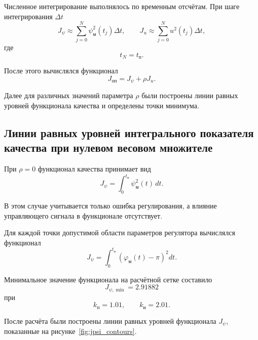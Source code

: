 Численное интегрирование выполнялось по временным отсчётам. При шаге интегрирования \(\Delta t\)
\begin{equation}
J_{\psi}
\approx
\sum_{j=0}^{N}
\psi_{\text{м}}^2(t_j)\Delta t,
\qquad
J_u
\approx
\sum_{j=0}^{N}
u^2(t_j)\Delta t,
\end{equation}
где
\begin{equation}
t_N=t_{\text{п}}.
\end{equation}

После этого вычислялся функционал
\begin{equation}
J_{\text{оп}}
=
J_{\psi}
+
\rho J_u.
\end{equation}

Далее для различных значений параметра \(\rho\) были построены линии равных уровней функционала качества и определены точки минимума.

\subsection{Линии равных уровней интегрального показателя качества при нулевом весовом множителе}

При \(\rho = 0\) функционал качества принимает вид
\begin{equation}
J_{\psi}
=
\int_0^{t_{\text{п}}}
\psi_{\text{м}}^2(t)\,dt.
\end{equation}

В этом случае учитывается только ошибка регулирования, а влияние управляющего сигнала в функционале отсутствует.

Для каждой точки допустимой области параметров регулятора вычислялся функционал
\begin{equation}
J_{\psi}
=
\int_0^{t_{\text{п}}}
\left(
\varphi_{\text{м}}(t)-\pi
\right)^2dt.
\end{equation}

Минимальное значение функционала на расчётной сетке составило
\begin{equation}
J_{\psi,\min}=2.91882
\end{equation}
при
\begin{equation}
k_{\text{п}}=1.01,
\qquad
k_{\text{и}}=2.01.
\end{equation}

После расчёта были построены линии равных уровней функционала \(J_{\psi}\), показанные на рисунке~\ref{fig:jpsi_contours}.


